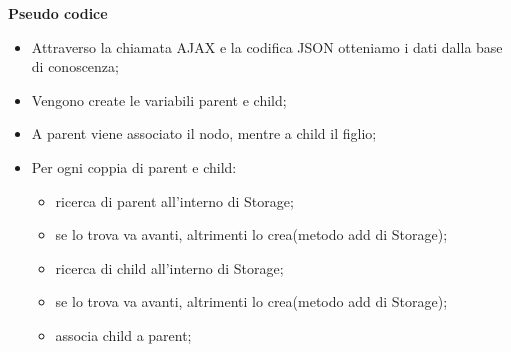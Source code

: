 \documentclass[a4paper,11pt]{article}
\begin{document}
\begin{enumerate}
\begin{enumerate}[label*=\arabic*.]
\textbf{Pseudo codice}
	\begin{itemize}
	\item Attraverso la chiamata AJAX e la codifica JSON otteniamo i dati dalla base di conoscenza;
	\item Vengono create le variabili parent e child;
	\item A parent viene associato il nodo, mentre a child il figlio;
	\item Per ogni coppia di parent e child:
		\begin{itemize}
		\item ricerca di parent all'interno di Storage; 
		\item se lo trova va avanti, altrimenti lo crea(metodo add di Storage);
		\item ricerca di child all'interno di Storage;
		\item se lo trova va avanti, altrimenti lo crea(metodo add di Storage);
		\item associa child a parent;
		

\end{itemize}
\end{itemize}
\end{enumerate}
\end{enumerate}
\end{document}
